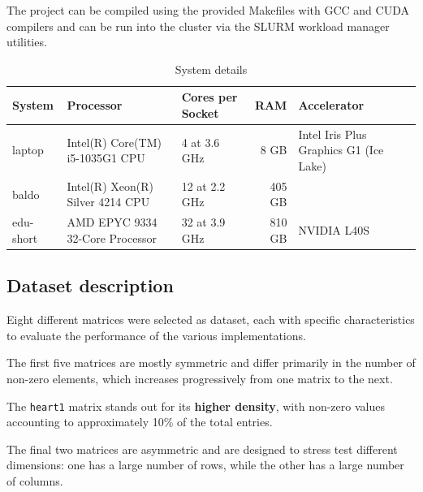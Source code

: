 \documentclass[conference]{IEEEtran}
\begin{document}
        The project can be compiled using the provided Makefiles with GCC and
        CUDA compilers and can be run into the cluster via the SLURM workload
        manager utilities.

        \begin{table}[ht]
            \caption{System details}
            \label{tab:system_description}
            \centering
            \begin{adjustbox}{width=\columnwidth}
            \begin{tabular}{lllrl}
            \toprule
            \textbf{System} &  \textbf{Processor} & \textbf{Cores per Socket} & \textbf{RAM} & \textbf{Accelerator} \\
            \midrule
                laptop & Intel(R) Core(TM) i5-1035G1 CPU & 4 at 3.6 GHz & 8 GB & Intel Iris Plus Graphics G1 (Ice Lake) \\
                baldo & Intel(R) Xeon(R) Silver 4214 CPU & 12 at 2.2 GHz & 405 GB & \\
                edu-short & AMD EPYC 9334 32-Core Processor & 32 at 3.9 GHz & 810 GB & NVIDIA L40S \\
            \bottomrule
            \end{tabular}
            \end{adjustbox}
        \end{table}

        \subsection{Dataset description}
        
        Eight different matrices were selected as dataset, each with specific
        characteristics to evaluate the performance of the various
        implementations.

        The first five matrices are mostly symmetric and differ primarily in
        the number of non-zero elements, which increases progressively from one
        matrix to the next.

        The \texttt{heart1} matrix stands out for its \textbf{higher density},
        with non-zero values accounting to approximately 10\% of the total
        entries.

        The final two matrices are asymmetric and are designed to stress test
        different dimensions: one has a large number of rows, while the other
        has a large number of columns.
\end{document}
